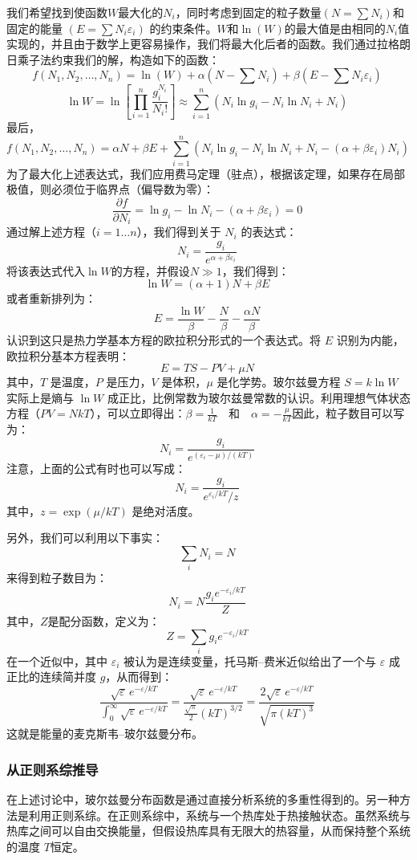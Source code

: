 我们希望找到使函数\(W\)最大化的\(N_i\)，同时考虑到固定的粒子数量\((N = \sum N_i)\)和固定的能量 \((E = \sum N_i \varepsilon_i)\) 的约束条件。\(W\)和\(\ln(W)\)的最大值是由相同的\(N_i\)值实现的，并且由于数学上更容易操作，我们将最大化后者的函数。我们通过拉格朗日乘子法约束我们的解，构造如下的函数：
\[
f(N_1, N_2, \dots, N_n) = \ln(W) + \alpha (N - \sum N_i) + \beta (E - \sum N_i \varepsilon_i)~
\]
\[
\ln W = \ln \left[\prod_{i=1}^{n} \frac{g_i^{N_i}}{N_i!}\right] \approx \sum_{i=1}^{n} \left(N_i \ln g_i - N_i \ln N_i + N_i \right)~
\]
最后，
\[
f(N_1, N_2, \dots, N_n) = \alpha N + \beta E + \sum_{i=1}^{n} \left( N_i \ln g_i - N_i \ln N_i + N_i - (\alpha + \beta \varepsilon_i) N_i \right)~
\]
为了最大化上述表达式，我们应用费马定理（驻点），根据该定理，如果存在局部极值，则必须位于临界点（偏导数为零）：
\[
\frac{\partial f}{\partial N_i} = \ln g_i - \ln N_i - (\alpha + \beta \varepsilon_i) = 0~
\]
通过解上述方程（\(i = 1 \ldots n\)），我们得到关于 \(N_i\) 的表达式：
\[
N_i = \frac{g_i}{e^{\alpha + \beta \varepsilon_i}}~
\]
将该表达式代入\(\ln W\)的方程，并假设\(N \gg 1\)，我们得到：
\[
\ln W = (\alpha + 1)N + \beta E~
\]
或者重新排列为：
\[
E = \frac{\ln W}{\beta} - \frac{N}{\beta} - \frac{\alpha N}{\beta}~
\]
认识到这只是热力学基本方程的欧拉积分形式的一个表达式。将 \(E\) 识别为内能，欧拉积分基本方程表明：
\[
E = TS - PV + \mu N~
\]
其中，\(T\) 是温度，\(P\) 是压力，\(V\) 是体积，\(\mu\) 是化学势。玻尔兹曼方程 \(S = k \ln W\) 实际上是熵与 \(\ln W\) 成正比，比例常数为玻尔兹曼常数的认识。利用理想气体状态方程（\(PV = NkT\)），可以立即得出：\(
\beta = \frac{1}{kT} \quad \text{和} \quad \alpha = -\frac{\mu}{kT}\)因此，粒子数目可以写为：
\[
N_i = \frac{g_i}{e^{(\varepsilon_i - \mu) / (kT)}}~
\]
注意，上面的公式有时也可以写成：
\[
N_i = \frac{g_i}{e^{\varepsilon_i / kT} / z}~
\]
其中，\(z = \exp(\mu / kT)\) 是绝对活度。

另外，我们可以利用以下事实：
\[
\sum_i N_i = N~
\]
来得到粒子数目为：
\[
N_i = N \frac{g_i e^{-\varepsilon_i / kT}}{Z}~
\]
其中，\(Z\)是配分函数，定义为：
\[Z = \sum_i g_i e^{-\varepsilon_i / kT}~\]
在一个近似中，其中 \(\varepsilon_i\) 被认为是连续变量，托马斯–费米近似给出了一个与 \(\varepsilon\) 成正比的连续简并度 \(g\)，从而得到：
\[
\frac{{\sqrt {\varepsilon }} \, e^{-\varepsilon / kT}}{\int_0^\infty {\sqrt {\varepsilon }} \, e^{-\varepsilon / kT}} = \frac{{\sqrt {\varepsilon }} \, e^{-\varepsilon / kT}}{\frac{{\sqrt {\pi}}}{2} (kT)^{3/2}} = \frac{{2 \sqrt {\varepsilon }} \, e^{-\varepsilon / kT}}{\sqrt {\pi (kT)^3}}~
\]
这就是能量的麦克斯韦–玻尔兹曼分布。
\subsubsection{从正则系综推导}
在上述讨论中，玻尔兹曼分布函数是通过直接分析系统的多重性得到的。另一种方法是利用正则系综。在正则系综中，系统与一个热库处于热接触状态。虽然系统与热库之间可以自由交换能量，但假设热库具有无限大的热容量，从而保持整个系统的温度 \(T\)恒定。

